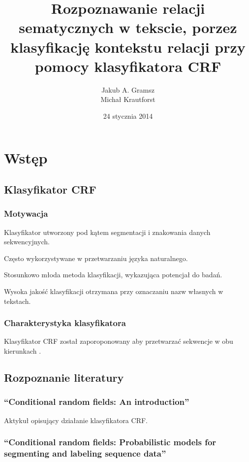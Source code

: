 \documentclass[a4paper,10pt]{report}
\title{Rozpoznawanie relacji sematycznych w tekscie, porzez klasyfikację kontekstu relacji przy pomocy klasyfikatora \textbf{CRF}}
\author{Jakub A. Gramsz \\ Michał Krautforst}
\date{24 stycznia 2014}
\begin{document}
\renewcommand{\figurename}{Wykres}
\renewcommand{\chaptername}{}

\maketitle
\tableofcontents

\chapter{Wstęp} %

\section{Klasyfikator CRF} 

\subsection{Motywacja}

Klasyfikator utworzony pod kątem segmentacji i znakowania danych sekwencyjnych.

Często wykorzystywane w przetwarzaniu języka naturalnego.

Stosunkowo młoda metoda klasyfikacji, wykazująca potencjał do badań.

Wysoka jakość klasyfikacji otrzymana przy oznaczaniu nazw własnych w tekstach.

\subsection{Charakterystyka klasyfikatora}

Klasyfikator CRF został zaporoponowany aby przetwarzać sekwencje w obu kierunkach \cite{lafferty2001crf}.

\section{Rozpoznanie literatury}

\subsection{``Conditional random fields: An introduction''\cite{wallach2004crf}}

Aktykuł opisujący działanie klasyfikatora CRF.

\subsection{``Conditional random fields: Probabilistic models for segmenting and labeling sequence data''\cite{lafferty2001crf}}
\end{document}
